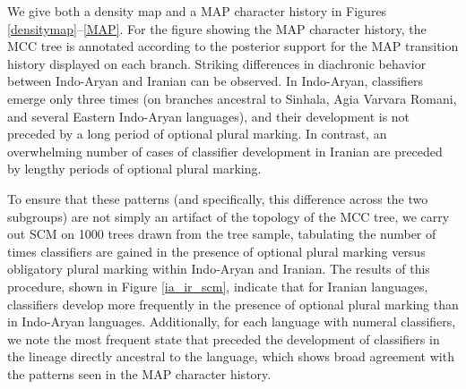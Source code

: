 \documentclass[11pt]{article}
\begin{document}
We give both a density map and a MAP character history in Figures \ref{densitymap}--\ref{MAP}. For the figure showing the MAP character history, the MCC tree is annotated according to the posterior support for the MAP transition history displayed on each branch. 
Striking differences in diachronic behavior between Indo-Aryan and Iranian can be observed. %
In Indo-Aryan, classifiers emerge only three times (on branches ancestral to Sinhala, Agia Varvara Romani, and several Eastern Indo-Aryan languages), and their development is not preceded by a long period of optional plural marking. 
In contrast, an overwhelming number of cases of classifier development in Iranian are preceded by lengthy periods of optional plural marking. 

To ensure that these patterns (and specifically, this difference across the two subgroups) are not simply an artifact of the topology of the MCC tree, we carry out SCM on 1000 trees drawn from the tree sample, tabulating the number of times classifiers are gained in the presence of optional plural marking versus obligatory plural marking within Indo-Aryan and Iranian. 
The results of this procedure, shown in Figure \ref{ia_ir_scm}, indicate that for Iranian languages, classifiers develop more frequently in the presence of optional plural marking than in Indo-Aryan languages. 
Additionally, for each language with numeral classifiers, we note the most frequent state that preceded the development of classifiers in the lineage directly ancestral to the language, which shows broad agreement with the patterns seen in the MAP character history. 
\end{document}

